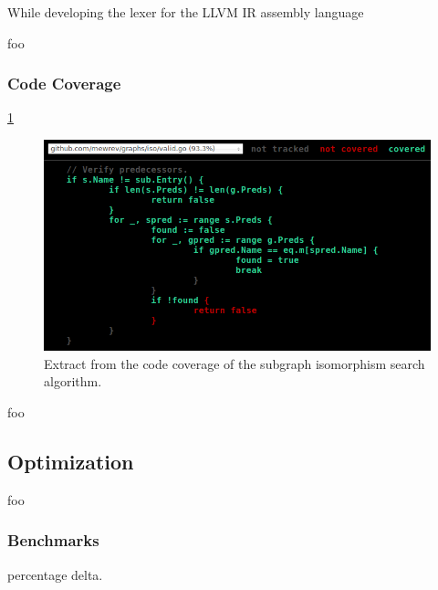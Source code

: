 \documentclass[12pt, a4paper]{article}
\begin{document}

While developing the lexer for the LLVM IR assembly language

foo

\subsubsection{Code Coverage}

\ref{iso_code_coverage}

\begin{figure}[htbp]
	\begin{center}
		\includegraphics[width=\textwidth]{inc/iso_code_coverage.png}
		\caption{Extract from the code coverage of the subgraph isomorphism search algorithm.}
		\label{iso_code_coverage}
	\end{center}
\end{figure}

foo


\subsection{Optimization}

foo

\subsubsection{Benchmarks}

percentage delta.
\end{document}
